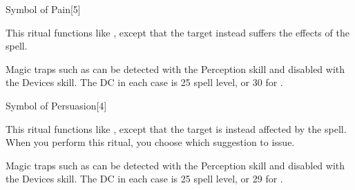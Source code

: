 \begin{spellsection}{Symbol of Pain}[5]
    \begin{spellheader}
    \end{spellheader}
    \begin{spellcontent}
        \begin{spelltargetinginfo}
        \end{spelltargetinginfo}
        \begin{spelleffects}

            \spellspecial This ritual functions like , except that the target instead suffers the effects of the  spell.
        \end{spelleffects}
    \end{spellcontent}
    \begin{spellfooter}
        \spellnotes Magic traps such as  can be detected with the Perception skill and disabled with the Devices skill. The DC in each case is 25 \add spell level, or 30 for .
    \end{spellfooter}
\end{spellsection}

\begin{spellsection}{Symbol of Persuasion}[4]
    \begin{spellheader}
    \end{spellheader}
    \begin{spellcontent}
        \begin{spelltargetinginfo}
        \end{spelltargetinginfo}
        \begin{spelleffects}

            \spellspecial This ritual functions like , except that the target is instead affected by the  spell. When you perform this ritual, you choose which suggestion to issue.
        \end{spelleffects}
    \end{spellcontent}
    \begin{spellfooter}
        \spellnotes Magic traps such as  can be detected with the Perception skill and disabled with the Devices skill. The DC in each case is 25 \add spell level, or 29 for .
    \end{spellfooter}
\end{spellsection}

